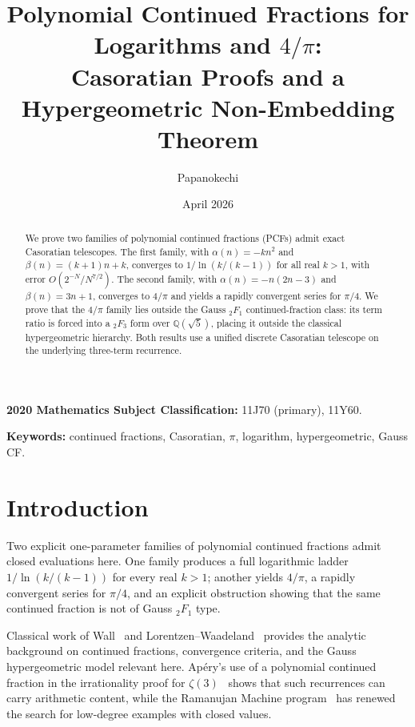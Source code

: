 \documentclass[11pt,a4paper]{article}
\title{Polynomial Continued Fractions for Logarithms and
\texorpdfstring{$4/\pi$}{4/pi}:\\
Casoratian Proofs and a Hypergeometric Non-Embedding Theorem}
\author{Papanokechi}
\date{April 2026}
\theoremstyle{plain}
\theoremstyle{definition}
\theoremstyle{remark}
\begin{document}
\maketitle

\begin{abstract}
We prove two families of polynomial continued fractions (PCFs) admit
exact Casoratian telescopes. The first family, with
$\alpha(n) = -kn^2$ and $\beta(n) = (k{+}1)n + k$, converges to
$1/\ln(k/(k{-}1))$ for all real $k>1$, with error $O(2^{-N}/N^{7/2})$.
The second family, with $\alpha(n) = -n(2n{-}3)$ and
$\beta(n) = 3n+1$, converges to $4/\pi$ and yields a rapidly
convergent series for $\pi/4$. We prove that the $4/\pi$ family
lies outside the Gauss ${}_2F_1$ continued-fraction class:
its term ratio is forced into a ${}_2F_3$ form over
$\mathbb{Q}(\sqrt{5})$, placing it outside the classical
hypergeometric hierarchy. Both results use a unified discrete
Casoratian telescope on the underlying three-term recurrence.
\end{abstract}

\noindent
\textbf{2020 Mathematics Subject Classification:}
11J70 (primary), 11Y60.

\noindent
\textbf{Keywords:}
continued fractions, Casoratian, $\pi$, logarithm,
hypergeometric, Gauss CF.

\tableofcontents

\section{Introduction}\label{sec:intro}

Two explicit one-parameter families of polynomial continued fractions admit
closed evaluations here. One family produces a full logarithmic ladder
$1/\ln(k/(k{-}1))$ for every real $k>1$; another yields $4/\pi$, a rapidly
convergent series for $\pi/4$, and an explicit obstruction showing that the
same continued fraction is not of Gauss ${}_2F_1$ type.

Classical work of Wall~\cite{wall1948} and Lorentzen--Waadeland~\cite{lorentzen2008}
provides the analytic background on continued fractions, convergence criteria,
and the Gauss hypergeometric model relevant here. Ap\'ery's use of a polynomial
continued fraction in the irrationality proof for $\zeta(3)$~\cite{apery1979}
shows that such recurrences can carry arithmetic content, while the Ramanujan
Machine program~\cite{raayoni2021,elimelech2024} has renewed the search for
low-degree examples with closed values.
\end{document}
